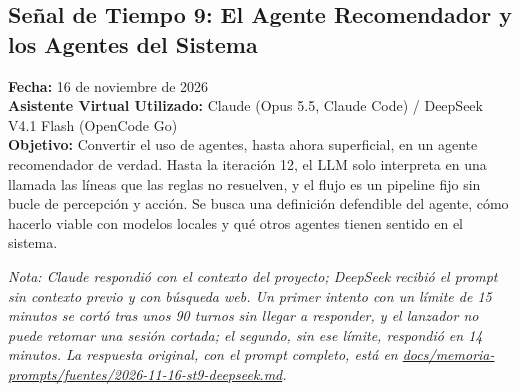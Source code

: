 \vspace{0.5cm}


\subsection{Señal de Tiempo 9: El Agente Recomendador y los Agentes del Sistema}
\textbf{Fecha:} 16 de noviembre de 2026 \\
\textbf{Asistente Virtual Utilizado:} Claude (Opus 5.5, Claude Code) / DeepSeek V4.1 Flash (OpenCode Go) \\
\textbf{Objetivo:} Convertir el uso de agentes, hasta ahora superficial, en un agente recomendador de verdad. Hasta la iteración 12, el LLM solo interpreta en una llamada las líneas que las reglas no resuelven, y el flujo es un pipeline fijo sin bucle de percepción y acción. Se busca una definición defendible del agente, cómo hacerlo viable con modelos locales y qué otros agentes tienen sentido en el sistema.

\textit{Nota: Claude respondió con el contexto del proyecto; DeepSeek recibió el prompt sin contexto previo y con búsqueda web. Un primer intento con un límite de 15 minutos se cortó tras unos 90 turnos sin llegar a responder, y el lanzador no puede retomar una sesión cortada; el segundo, sin ese límite, respondió en 14 minutos. La respuesta original, con el prompt completo, está en \url{docs/memoria-prompts/fuentes/2026-11-16-st9-deepseek.md}.}

